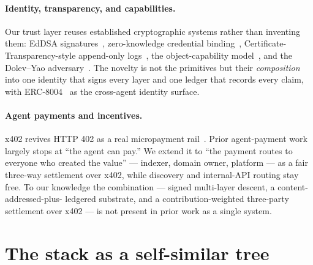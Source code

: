 \documentclass[11pt]{article}
\begin{document}
\paragraph{Identity, transparency, and capabilities.} Our trust layer reuses
established cryptographic systems rather than inventing them: EdDSA
signatures~\cite{rfc8032}, zero-knowledge credential binding~\cite{zklogin,camlys},
Certificate-Transparency-style append-only logs~\cite{rfc6962}, the object-capability
model~\cite{ocap}, and the Dolev--Yao adversary~\cite{dolevyao}. The novelty is not the
primitives but their \emph{composition} into one identity that signs every layer and
one ledger that records every claim, with ERC-8004~\cite{erc8004} as the cross-agent
identity surface.

\paragraph{Agent payments and incentives.} x402 revives HTTP 402 as a real
micropayment rail~\cite{x402}. Prior agent-payment work largely stops at ``the agent
can pay.'' We extend it to ``the payment routes to everyone who created the value'' ---
indexer, domain owner, platform --- as a fair three-way settlement over x402, while
discovery and internal-API routing stay free. To our
knowledge the combination --- signed multi-layer descent, a content-addressed-plus-
ledgered substrate, and a contribution-weighted three-party settlement over x402 --- is
not present in prior work as a single system.

\section{The stack as a self-similar tree}
\end{document}
